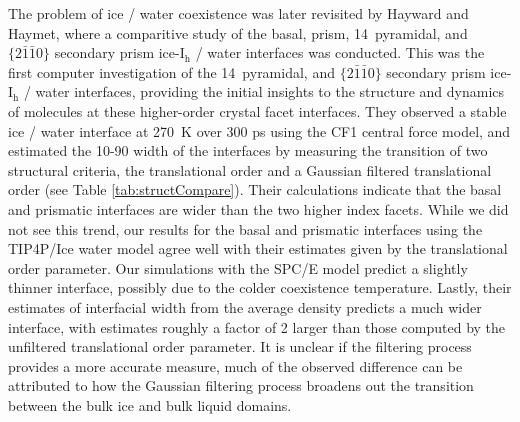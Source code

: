 The problem of ice / water coexistence was later revisited by Hayward
and Haymet, where a comparitive study of the basal, prism,
14\degree~pyramidal, and $\{2\bar{1}\bar{1}0\}$ secondary prism
ice-I$_\mathrm{h}$ / water interfaces was conducted.\cite{Hayward2001}
This was the first computer investigation of the 14\degree~pyramidal,
and $\{2\bar{1}\bar{1}0\}$ secondary prism ice-I$_\mathrm{h}$ / water
interfaces, providing the initial insights to the structure and
dynamics of molecules at these higher-order crystal facet
interfaces. %
They observed a stable ice / water interface at 270~K over 300 ps
using the CF1 central force model, and estimated the 10-90 width of
the interfaces by measuring the transition of two structural criteria,
the translational order and a Gaussian filtered translational order
(see Table \ref{tab:structCompare}). Their calculations indicate that
the basal and prismatic interfaces are wider than the two higher index
facets. While we did not see this trend, our results for the basal and
prismatic interfaces using the TIP4P/Ice water model agree well with
their estimates given by the translational order parameter. Our
simulations with the SPC/E model predict a slightly thinner interface,
possibly due to the colder coexistence temperature. Lastly, their
estimates of interfacial width from the average density predicts a
much wider interface, with estimates roughly a factor of 2 larger than
those computed by the unfiltered translational order parameter. It is
unclear if the filtering process provides a more accurate measure,
much of the observed difference can be attributed to how the Gaussian
filtering process broadens out the transition between the bulk ice and
bulk liquid domains.
 

